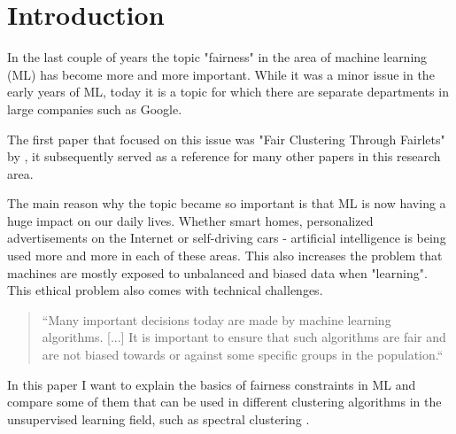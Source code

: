 \section{Introduction}

In the last couple of years the topic "fairness" in the area of machine learning (ML) has become more and more important. While it was a minor issue in the early years of ML, today it is a topic for which there are separate departments in large companies such as Google.

The first paper that focused on this issue was "Fair Clustering Through Fairlets" by \textcite{Chierichetti2018}, it subsequently served as a reference for many other papers in this research area.

The main reason why the topic became so important is that ML is now having a huge impact on our daily lives. Whether smart homes, personalized advertisements on the Internet or self-driving cars - artificial intelligence is being used more and more in each of these areas. This also increases the problem that machines are mostly exposed to unbalanced and biased data when "learning". This ethical problem also comes with technical challenges.

\begin{quote}
    ``Many important decisions today are made by machine learning algorithms. [...] It is important to ensure that such algorithms are fair and are not biased towards or against some specific groups in the population.``
    
\autocite[1]{Bera2019}
\end{quote}


In this paper I want to explain the basics of fairness constraints in ML and compare some of them that can be used in different clustering algorithms in the unsupervised learning \autocite[]{Barlow1989} field, such as spectral clustering \autocite[]{Kleindessner2019}.
